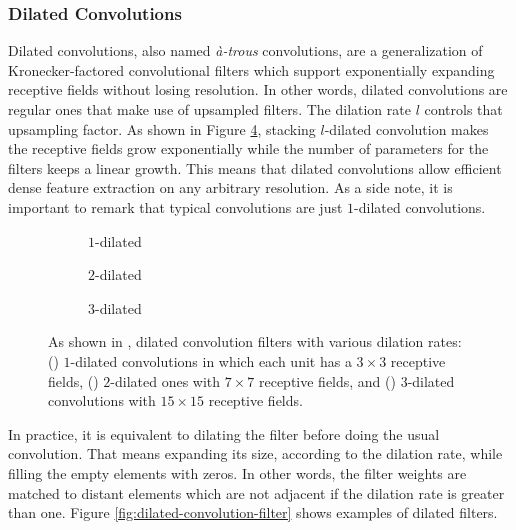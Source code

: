 \subsubsection{Dilated Convolutions}

Dilated convolutions, also named \emph{à-trous} convolutions, are a generalization of Kronecker-factored convolutional filters \cite{Zhou2015} which support exponentially expanding receptive fields without losing resolution. In other words, dilated convolutions are regular ones that make use of upsampled filters. The dilation rate $l$ controls that upsampling factor. As shown in Figure \ref{fig:dilated-convolution}, stacking $l$-dilated convolution makes the receptive fields grow exponentially while the number of parameters for the filters keeps a linear growth. This means that dilated convolutions allow efficient dense feature extraction on any arbitrary resolution. As a side note, it is important to remark that typical convolutions are just $1$-dilated convolutions.

\begin{figure}[!hbt]
	\hfill
	\begin{subfigure}{0.30\linewidth}
		\caption{$1$-dilated}
		\label{fig:dilated-convolution:1}
	\end{subfigure}
	\hfill
	\begin{subfigure}{0.30\linewidth}
		\caption{$2$-dilated}
		\label{fig:dilated-convolution:2}
	\end{subfigure}
	\hfill
	\begin{subfigure}{0.30\linewidth}
		\caption{$3$-dilated}
		\label{fig:dilated-convolution:3}
	\end{subfigure}
	\hfill
	\caption{As shown in \cite{Yu2015}, dilated convolution filters with various dilation rates: (\protect{}) $1$-dilated convolutions in which each unit has a $3\times3$ receptive fields, (\protect{}) $2$-dilated ones with $7\times7$ receptive fields, and (\protect{}) $3$-dilated convolutions with $15\times15$ receptive fields.}
	\label{fig:dilated-convolution}
\end{figure}

In practice, it is equivalent to dilating the filter before doing the usual convolution. That means expanding its size, according to the dilation rate, while filling the empty elements with zeros. In other words, the filter weights are matched to distant elements which are not adjacent if the dilation rate is greater than one. Figure \ref{fig:dilated-convolution-filter} shows examples of dilated filters.

